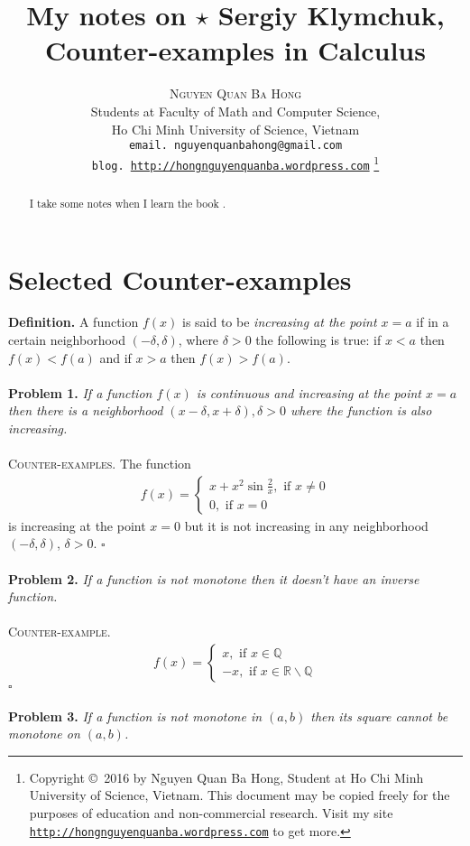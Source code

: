 \documentclass[a4paper]{article}
\title{My notes on $\star$ Sergiy Klymchuk, Counter-examples in Calculus }
\author{\textsc{Nguyen Quan Ba Hong}\\
{\small Students at Faculty of Math and Computer Science,}\\ 
{\small Ho Chi Minh University of Science, Vietnam} \\
{\small \texttt{email. nguyenquanbahong@gmail.com}}\\
{\small \texttt{blog. \url{http://hongnguyenquanba.wordpress.com}} 
\footnote{Copyright \copyright\ 2016 by Nguyen Quan Ba Hong, Student at Ho Chi Minh University of Science, Vietnam. This document may be copied freely for the purposes of education and non-commercial research. Visit my site \texttt{\url{http://hongnguyenquanba.wordpress.com}} to get more.}}}
\numberwithin{equation}{section}
\begin{document}
\maketitle
\begin{abstract}
I take some notes when I learn the book \cite{1}.
\end{abstract}
\newpage
\tableofcontents
\newpage
\section{Selected Counter-examples}
\textbf{Definition.} A function $f(x)$ is said to be \textit{increasing at the point $x=a$} if in a certain neighborhood $\left( { - \delta ,\delta } \right)$, where $\delta >0$ the following is true: if $x<a$ then $f(x)<f(a)$ and if $x>a$ then $f(x)>f(a)$.\\
\\
\textbf{Problem 1.} \textit{If a function $f(x)$ is continuous and increasing at the point $x=a$ then there is a neighborhood $\left( {x - \delta ,x + \delta } \right),\delta  > 0$ where the function is also increasing.}\\
\\
\textsc{Counter-examples.} The function 
\begin{align}
f\left( x \right) = \left\{ {\begin{array}{*{20}{c}}
{x + {x^2}\sin \frac{2}{x},\mbox{ if }x \ne 0}\\
{0,\mbox{ if }x = 0}
\end{array}} \right.
\end{align}
is increasing at the point $x=0$ but it is not increasing in any neighborhood $\left( { - \delta ,\delta } \right)$, $\delta >0$. \hfill $\square$\\
\\
\textbf{Problem 2.} \textit{If a function is not monotone then it doesn't have an inverse function.}\\
\\
\textsc{Counter-example.} 
\begin{align}
f\left( x \right) = \left\{ {\begin{array}{*{20}{c}}
{x,\mbox{ if } x \in \mathbb{Q}}\\
{ - x,\mbox{ if } x \in \mathbb{R}\backslash \mathbb{Q} }
\end{array}} \right. 
\end{align}
\hfill $\square$\\
\\
\textbf{Problem 3.} \textit{If a function is not monotone in $(a,b)$ then its square cannot be monotone on $(a,b)$.}\\
\end{document}
